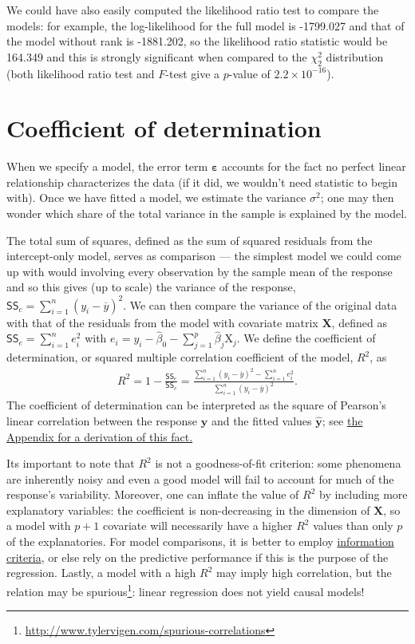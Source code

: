 \documentclass[
  11pt,
  letterpaper,
]{book}
\renewcommand{\href}[2]{#2\footnote{\url{#1}}}
\theoremstyle{definition}
\theoremstyle{definition}
\theoremstyle{definition}
\theoremstyle{remark}
\begin{document}
We could have also easily computed the likelihood ratio test to compare the models: for example, the log-likelihood for the full model is -1799.027 and that of the model without rank is -1881.202, so the likelihood ratio statistic would be 164.349 and this is strongly significant when compared to the \(\chi^2_2\) distribution (both likelihood ratio test and \(F\)-test give a \(p\)-value of \(2.2 \times 10^{-16}\)).

\hypertarget{coefR2}{%
\section{Coefficient of determination}\label{coefR2}}

When we specify a model, the error term \(\boldsymbol{\varepsilon}\) accounts for the fact no perfect linear relationship characterizes the data (if it did, we wouldn't need statistic to begin with). Once we have fitted a model, we estimate the variance \(\sigma^2\); one may then wonder which share of the total variance in the sample is explained by the model.

The total sum of squares, defined as the sum of squared residuals from the intercept-only model, serves as comparison --- the simplest model we could come up with would involving every observation by the sample mean of the response and so this gives (up to scale) the variance of the response, \(\mathsf{SS}_c = \sum_{i=1}^n (y_i - \overline{y})^2\). We can then compare the variance of the original data with that of the residuals from the model with covariate matrix \(\mathbf{X}\), defined as \(\mathsf{SS}_e =\sum_{i=1}^n e_i^2\) with \(e_i = y_i - \widehat{\beta}_0 - \sum_{j=1}^p \widehat{\beta}_j\mathrm{X}_j\).
We define the coefficient of determination, or squared multiple correlation coefficient of the model, \(R^2\), as
\begin{align*}
R^2 = 1- \frac{\mathsf{SS}_e}{\mathsf{SS}_c} = \frac{\sum_{i=1}^n (y_i - \overline{y})^2- \sum_{i=1}^n e_i^2}{\sum_{i=1}^n (y_i - \overline{y})^2}.
\end{align*}
The coefficient of determination can be interpreted as the square of Pearson's linear correlation between the response \(\boldsymbol{y}\) and the fitted values \(\widehat{\boldsymbol{y}}\); see \protect\hyperlink{derivationR2}{the Appendix for a derivation of this fact.}

Its important to note that \(R^2\) is not a goodness-of-fit criterion: some phenomena are inherently noisy and even a good model will fail to account for much of the response's variability. Moreover, one can inflate the value of \(R^2\) by including more explanatory variables: the coefficient is non-decreasing in the dimension of \(\mathbf{X}\), so a model with \(p+1\) covariate will necessarily have a higher \(R^2\) values than only \(p\) of the explanatories. For model comparisons, it is better to employ \protect\hyperlink{information-criteria}{information criteria}, or else rely on the predictive performance if this is the purpose of the regression. Lastly, a model with a high \(R^2\) may imply high correlation, but \href{http://www.tylervigen.com/spurious-correlations}{the relation may be spurious}: linear regression does not yield causal models!
\end{document}
